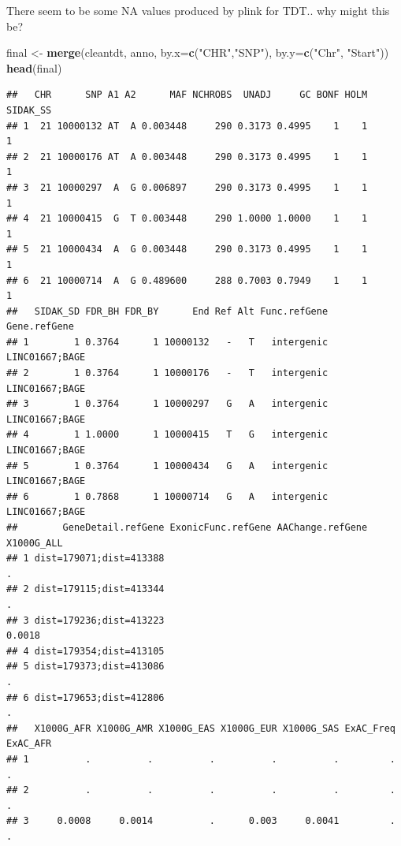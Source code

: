 \documentclass[
]{article}
\newenvironment{Shaded}{\begin{snugshade}}{\end{snugshade}}
\newcommand{\DataTypeTok}[1]{\textcolor[rgb]{0.13,0.29,0.53}{#1}}
\newcommand{\KeywordTok}[1]{\textcolor[rgb]{0.13,0.29,0.53}{\textbf{#1}}}
\newcommand{\NormalTok}[1]{#1}
\newcommand{\StringTok}[1]{\textcolor[rgb]{0.31,0.60,0.02}{#1}}
\begin{document}
There seem to be some NA values produced by plink for TDT.. why might
this be?

\begin{Shaded}
\begin{Highlighting}[]
\NormalTok{final <-}\StringTok{ }\KeywordTok{merge}\NormalTok{(cleantdt, anno, }\DataTypeTok{by.x=}\KeywordTok{c}\NormalTok{(}\StringTok{"CHR"}\NormalTok{,}\StringTok{"SNP"}\NormalTok{), }\DataTypeTok{by.y=}\KeywordTok{c}\NormalTok{(}\StringTok{"Chr"}\NormalTok{, }\StringTok{"Start"}\NormalTok{))}
\KeywordTok{head}\NormalTok{(final)}
\end{Highlighting}
\end{Shaded}

\begin{verbatim}
##   CHR      SNP A1 A2      MAF NCHROBS  UNADJ     GC BONF HOLM SIDAK_SS
## 1  21 10000132 AT  A 0.003448     290 0.3173 0.4995    1    1        1
## 2  21 10000176 AT  A 0.003448     290 0.3173 0.4995    1    1        1
## 3  21 10000297  A  G 0.006897     290 0.3173 0.4995    1    1        1
## 4  21 10000415  G  T 0.003448     290 1.0000 1.0000    1    1        1
## 5  21 10000434  A  G 0.003448     290 0.3173 0.4995    1    1        1
## 6  21 10000714  A  G 0.489600     288 0.7003 0.7949    1    1        1
##   SIDAK_SD FDR_BH FDR_BY      End Ref Alt Func.refGene   Gene.refGene
## 1        1 0.3764      1 10000132   -   T   intergenic LINC01667;BAGE
## 2        1 0.3764      1 10000176   -   T   intergenic LINC01667;BAGE
## 3        1 0.3764      1 10000297   G   A   intergenic LINC01667;BAGE
## 4        1 1.0000      1 10000415   T   G   intergenic LINC01667;BAGE
## 5        1 0.3764      1 10000434   G   A   intergenic LINC01667;BAGE
## 6        1 0.7868      1 10000714   G   A   intergenic LINC01667;BAGE
##        GeneDetail.refGene ExonicFunc.refGene AAChange.refGene X1000G_ALL
## 1 dist=179071;dist=413388                                              .
## 2 dist=179115;dist=413344                                              .
## 3 dist=179236;dist=413223                                         0.0018
## 4 dist=179354;dist=413105                                               
## 5 dist=179373;dist=413086                                              .
## 6 dist=179653;dist=412806                                              .
##   X1000G_AFR X1000G_AMR X1000G_EAS X1000G_EUR X1000G_SAS ExAC_Freq ExAC_AFR
## 1          .          .          .          .          .         .        .
## 2          .          .          .          .          .         .        .
## 3     0.0008     0.0014          .      0.003     0.0041         .        .

\end{verbatim}
\end{document}
